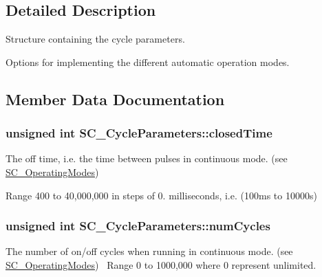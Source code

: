 \subsection{Detailed Description}
Structure containing the cycle parameters. 

Options for implementing the different automatic operation modes. 

\subsection{Member Data Documentation}
\subsubsection[{\texorpdfstring{closed\+Time}{closedTime}}]{\setlength{\rightskip}{0pt plus 5cm}unsigned int S\+C\+\_\+\+Cycle\+Parameters\+::closed\+Time}\hypertarget{struct_s_c___cycle_parameters_a871bacab41e33d3c5979a000021c0bcb}{}\label{struct_s_c___cycle_parameters_a871bacab41e33d3c5979a000021c0bcb}


The off time, i.\+e. the time between pulses in continuous mode. (see \hyperlink{group___t_cube_solenoid_ga02b53b0f5b45f74b6b2da24cc6ff2895}{S\+C\+\_\+\+Operating\+Modes})~\newline
 

Range 400 to 40,000,000 in steps of 0. milliseconds, i.\+e. (100ms to 10000s) 
\subsubsection[{\texorpdfstring{num\+Cycles}{numCycles}}]{\setlength{\rightskip}{0pt plus 5cm}unsigned int S\+C\+\_\+\+Cycle\+Parameters\+::num\+Cycles}\hypertarget{struct_s_c___cycle_parameters_a829e4ed3529bfe6ae3dc88098386a387}{}\label{struct_s_c___cycle_parameters_a829e4ed3529bfe6ae3dc88098386a387}


The number of on/off cycles when running in continuous mode. (see \hyperlink{group___t_cube_solenoid_ga02b53b0f5b45f74b6b2da24cc6ff2895}{S\+C\+\_\+\+Operating\+Modes})~\newline
 Range 0 to 1000,000 where 0 represent unlimited. 

